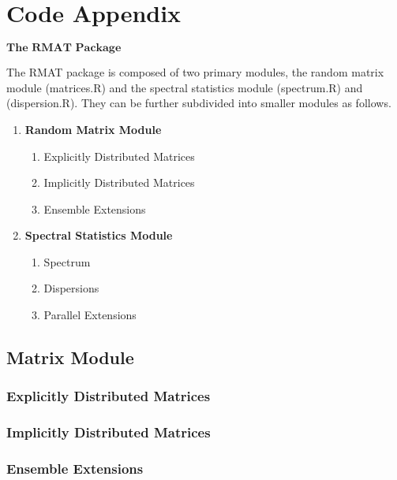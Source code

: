 \chapter{Code Appendix}

$\textbf{The RMAT Package}$ \hfill \newline

\noindent
The RMAT package is composed of two primary modules, the random matrix module (matrices.R) and the spectral statistics module (spectrum.R) and (dispersion.R). They can be further subdivided into smaller modules as follows.

\begin{enumerate}
  \item \textbf{Random Matrix Module}
    \begin{enumerate}
      \item Explicitly Distributed Matrices
      \item Implicitly Distributed Matrices
      \item Ensemble Extensions
    \end{enumerate}

  \item \textbf{Spectral Statistics Module}
    \begin{enumerate}
      \item Spectrum
      \item Dispersions
      \item Parallel Extensions
    \end{enumerate}
\end{enumerate}

\newpage

\section{Matrix Module}

\subsection{Explicitly Distributed Matrices}

\subsection{Implicitly Distributed Matrices}

\subsection{Ensemble Extensions}

